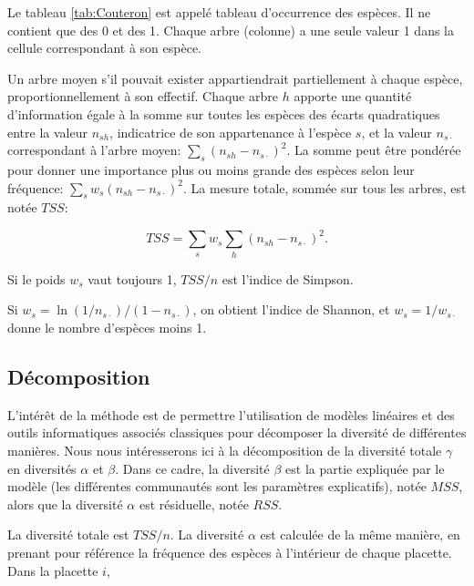 \documentclass[
  11pt,
  french,
  a4paper,
  extrafontsizes,onecolumn,openright
  ]{memoir}
\begin{document}
Le tableau \ref{tab:Couteron} est appelé tableau d'occurrence des espèces.
Il ne contient que des 0 et des 1.
Chaque arbre (colonne) a une seule valeur 1 dans la cellule correspondant à son espèce.

Un arbre moyen s'il pouvait exister appartiendrait partiellement à chaque espèce, proportionnellement à son effectif.
Chaque arbre \(h\) apporte une quantité d'information égale à la somme sur toutes les espèces des écarts quadratiques entre la valeur \(n_{sh}\), indicatrice de son appartenance à l'espèce \(s\), et la valeur \(n_{s\cdot }\) correspondant à l'arbre moyen: \(\sum_s{{\left(n_{sh}-n_{s\cdot }\right)}^2}\).
La somme peut être pondérée pour donner une importance plus ou moins grande des espèces selon leur fréquence: \(\sum_s{{w_s\left(n_{sh}-n_{s\cdot }\right)}^2}\).
La mesure totale, sommée sur tous les arbres, est notée \(\mathit{TSS}\):

\begin{equation}
  \label{eq:TSS}
  \mathit{TSS} = \sum_s{w_s\sum_h{{\left(n_{sh}-n_{s\cdot}\right)}^2}}.
\end{equation}

Si le poids \(w_s\) vaut toujours 1, \(\mathit{TSS}/{n}\) est l'indice de Simpson.

Si \(w_s={\ln{\left(1/{n_{s\cdot}}\right)}/{\left(1-n_{s\cdot}\right)}}\), on obtient l'indice de Shannon, et \(w_s={1}/{w_{s\cdot}}\) donne le nombre d'espèces moins 1.

\subsection{Décomposition}\label{sec-PCdecomposition}

L'intérêt de la méthode est de permettre l'utilisation de modèles linéaires et des outils informatiques associés classiques pour décomposer la diversité de différentes manières.
Nous nous intéresserons ici à la décomposition de la diversité totale \(\gamma\) en diversités \(\alpha\) et \(\beta\).
Dans ce cadre, la diversité \(\beta\) est la partie expliquée par le modèle (les différentes communautés sont les paramètres explicatifs), notée \(\mathit{MSS}\), alors que la diversité \(\alpha\) est résiduelle, notée \(\mathit{RSS}\).

La diversité totale est \(\mathit{TSS}/{n}\).
La diversité \(\alpha\) est calculée de la même manière, en prenant pour référence la fréquence des espèces à l'intérieur de chaque placette.
Dans la placette \(i\),
\end{document}
